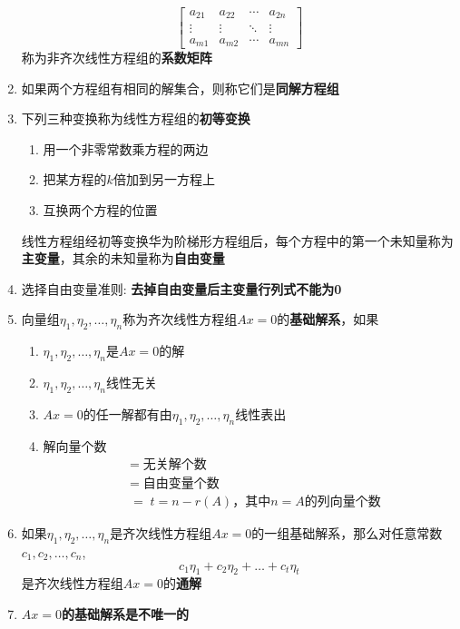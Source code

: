 \documentclass[a4paper,12pt]{article}
\begin{document}
\begin{enumerate}
\[\begin{bmatrix}
                a_{21} & a_{22} & \cdots & a_{2n} \\
                \vdots & \vdots & \ddots & \vdots \\
                a_{m1} & a_{m2} & \cdots & a_{mn}
            \end{bmatrix}
        \]
        称为非齐次线性方程组的\textbf{系数矩阵}
        \item 如果两个方程组有相同的解集合，则称它们是\textbf{同解方程组}
        \item 下列三种变换称为线性方程组的\textbf{初等变换}
        \begin{enumerate}
            \item 用一个非零常数乘方程的两边
            \item 把某方程的$k$倍加到另一方程上
            \item 互换两个方程的位置
        \end{enumerate}
        线性方程组经初等变换华为阶梯形方程组后，每个方程中的第一个未知量\textbf{\color{red}{通常}}称为\textbf{主变量}，其余的未知量称为\textbf{自由变量}
        \item 选择自由变量准则: \textbf{去掉自由变量后主变量行列式不能为0}
        \item 向量组$\eta_1, \eta_2, \dots, \eta_n$称为齐次线性方程组$Ax = 0$的\textbf{基础解系}，如果
        \begin{enumerate}
            \item $\eta_1, \eta_2, \dots, \eta_n$是$Ax = 0$的解
            \item $\eta_1, \eta_2, \dots, \eta_n$线性无关
            \item $Ax = 0$的任一解都有由$\eta_1, \eta_2, \dots, \eta_n$线性表出
            \item 解向量个数
            \begin{align*}
                &= \; \text{无关解个数} \\
                &= \; \text{自由变量个数} \\
                &= \; t = n - r(A)\text{，其中}n = A\text{的列向量个数}
            \end{align*}
        \end{enumerate}
        \item 如果$\eta_1, \eta_2, \dots, \eta_n$是齐次线性方程组$Ax = 0$的一组基础解系，那么对任意常数$c_1, c_2, \dots, c_n$,
        \[
            c_{1}\eta_1 + c_{2}\eta_2 + \dots + c_{t}\eta_t
        \]
        是齐次线性方程组$Ax = 0$的\textbf{通解}
        \item $Ax = 0$\textbf{的基础解系是不唯一的}

\end{enumerate}
\end{document}
